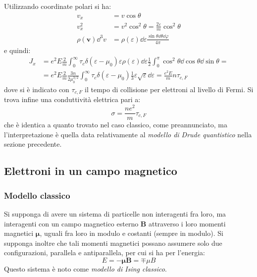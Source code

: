 Utilizzando coordinate polari si ha:
\begin{align*}
v_x &= v \cos \theta\\
v_x^2 &= v^2 \cos^2 \theta = \frac{2 \varepsilon}{m} \cos^2 \theta\\
\rho(\textbf{v}) \dd^3 v &= \rho(\varepsilon) \dd \varepsilon \frac{\sin \theta \dd \theta \dd \varphi}{4\pi}
\end{align*}
e quindi:
\begin{align*}
J_x &= e^2 E \frac{2}{m} \int_0^\infty \tau_c \delta (\varepsilon - \mu_0) \varepsilon \rho(\varepsilon) \dd \varepsilon \frac{1}{2} \int_0^\pi \cos^2 \theta \dd \cos\theta \dd \sin\theta =\\
&= e^2 E \frac{2}{m} \frac{3n}{2 \mu_0^{3/2}} \int_0^\infty \tau_c \delta (\varepsilon - \mu_0) \frac{1}{3} \varepsilon \sqrt{\varepsilon} \dd \varepsilon = \frac{e^2 E}{m} n \tau_{c,F}
\end{align*}
dove si è indicato con $ \tau_{c,F} $ il tempo di collisione per elettroni al livello di Fermi. Si trova infine una conduttività elettrica pari a:
\begin{equation*}
\sigma = \frac{n e^2}{m} \tau_{c,F}
\end{equation*}
che è identica a quanto trovato nel caso classico, come preannunciato, ma l'interpretazione è quella data relativamente al \textit{modello di Drude quantistico} nella sezione precedente.

\subsection{Elettroni in un campo magnetico}

\subsubsection{Modello classico}

Si supponga di avere un sistema di particelle non interagenti fra loro, ma interagenti con un campo magnetico esterno $ \textbf{B} $ attraverso i loro momenti magnetici $ \bm{\mu} $, uguali fra loro in modulo e costanti (sempre in modulo). Si supponga inoltre che tali momenti magnetici possano assumere solo due configurazioni, parallela e antiparallela, per cui si ha per l'energia:
\begin{equation*}
E = - \bm{\mu}\textbf{B} = \mp \mu B
\end{equation*}
Questo sistema è noto come \textit{modello di Ising classico}.

